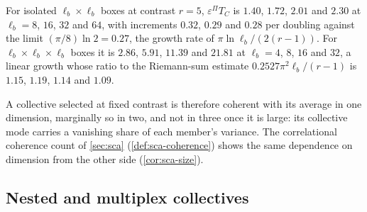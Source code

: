 \begin{observation}\label{obs:col-coherence-dimension}
For isolated $\ell_b\times\ell_b$ boxes at contrast $r=5$, $\varepsilon^\Pi T_C$ is $1.40$, $1.72$, $2.01$ and $2.30$ at $\ell_b=8$, $16$, $32$ and $64$, with increments $0.32$, $0.29$ and $0.28$ per doubling against the limit $(\pi/8)\ln2=0.27$, the growth rate of $\pi\ln\ell_b/(2(r-1))$. For $\ell_b\times\ell_b\times\ell_b$ boxes it is $2.86$, $5.91$, $11.39$ and $21.81$ at $\ell_b=4$, $8$, $16$ and $32$, a linear growth whose ratio to the Riemann-sum estimate $0.2527\pi^2\ell_b/(r-1)$ is $1.15$, $1.19$, $1.14$ and $1.09$.
\end{observation}
A collective selected at fixed contrast is therefore coherent with its average in one dimension, marginally so in two, and not in three once it is large: its collective mode carries a vanishing share of each member's variance. The correlational coherence count of \cref{sec:sca} (\cref{def:sca-coherence}) shows the same dependence on dimension from the other side (\cref{cor:sca-size}).

\subsection{Nested and multiplex collectives}\label{sup:col-nested-and-multiplex-collectives}


